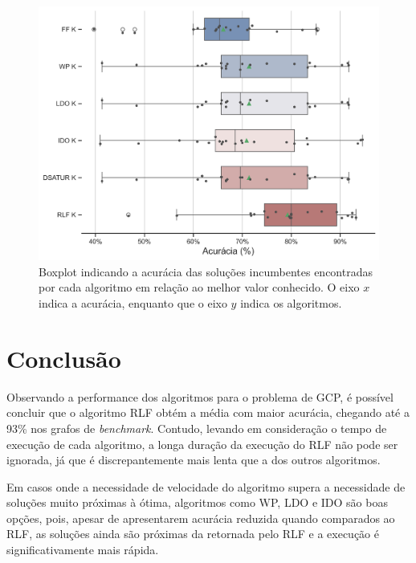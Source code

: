 \documentclass[10pt, twocolumn]{article}
\begin{document}
\begin{figure}[H]
  \centering
  \includegraphics[scale=0.43]{img/boxplot.png}
  \caption{Boxplot indicando a acurácia das soluções incumbentes encontradas por
  cada algoritmo em relação ao melhor valor conhecido.
  O eixo $x$ indica a acurácia, enquanto que o eixo $y$ indica os algoritmos.
  }
  \label{fig:boxplot}
\end{figure}


\section{Conclusão}
Observando a performance dos algoritmos para o problema de GCP, é possível concluir
que o algoritmo RLF obtém a média com maior acurácia, chegando até a 93\% nos
grafos de \emph{benchmark}. Contudo, levando em consideração o tempo de execução
de cada algoritmo, a longa duração da execução do RLF não pode ser ignorada,
já que é discrepantemente mais lenta que a dos outros algoritmos.

Em casos onde a necessidade de velocidade do algoritmo supera a necessidade de 
soluções muito próximas à ótima, algoritmos como WP, LDO e IDO são boas opções,
pois, apesar de apresentarem acurácia reduzida quando comparados ao RLF,
as soluções ainda são próximas da retornada pelo RLF e a execução é significativamente
mais rápida.





\end{document}
